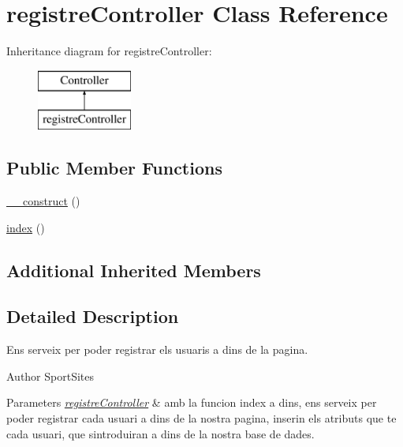 \hypertarget{classregistre_controller}{}\section{registre\+Controller Class Reference}
\label{classregistre_controller}
Inheritance diagram for registre\+Controller\+:\begin{figure}[H]
\begin{center}
\leavevmode
\includegraphics[height=2.000000cm]{classregistre_controller}
\end{center}
\end{figure}
\subsection*{Public Member Functions}
\begin{DoxyCompactItemize}
\item 
\hyperlink{classregistre_controller_a095c5d389db211932136b53f25f39685}{\+\_\+\+\_\+construct} ()
\item 
\hyperlink{classregistre_controller_a149eb92716c1084a935e04a8d95f7347}{index} ()
\end{DoxyCompactItemize}
\subsection*{Additional Inherited Members}


\subsection{Detailed Description}
Ens serveix per poder registrar els usuaris a dins de la pagina.

\begin{DoxyAuthor}{Author}
Sport\+Sites 
\end{DoxyAuthor}

\begin{DoxyParams}{Parameters}
{\em \hyperlink{classregistre_controller}{registre\+Controller}} & amb la funcion index a dins, ens serveix per poder registrar cada usuari a dins de la nostra pagina, inserin els atributs que te cada usuari, que s\textquotesingle{}introduiran a dins de la nostra base de dades. \\
\hline
\end{DoxyParams}


